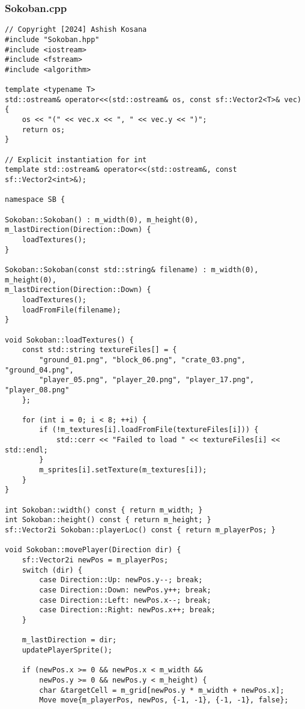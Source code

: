 \documentclass[12pt]{article}
\begin{document}
\subsubsection{Sokoban.cpp}
\begin{lstlisting}[style=cppcode]
// Copyright [2024] Ashish Kosana
#include "Sokoban.hpp"
#include <iostream>
#include <fstream>
#include <algorithm>

template <typename T>
std::ostream& operator<<(std::ostream& os, const sf::Vector2<T>& vec) {
    os << "(" << vec.x << ", " << vec.y << ")";
    return os;
}

// Explicit instantiation for int
template std::ostream& operator<<(std::ostream&, const sf::Vector2<int>&);

namespace SB {

Sokoban::Sokoban() : m_width(0), m_height(0), m_lastDirection(Direction::Down) {
    loadTextures();
}

Sokoban::Sokoban(const std::string& filename) : m_width(0), m_height(0),
m_lastDirection(Direction::Down) {
    loadTextures();
    loadFromFile(filename);
}

void Sokoban::loadTextures() {
    const std::string textureFiles[] = {
        "ground_01.png", "block_06.png", "crate_03.png", "ground_04.png",
        "player_05.png", "player_20.png", "player_17.png", "player_08.png"
    };

    for (int i = 0; i < 8; ++i) {
        if (!m_textures[i].loadFromFile(textureFiles[i])) {
            std::cerr << "Failed to load " << textureFiles[i] << std::endl;
        }
        m_sprites[i].setTexture(m_textures[i]);
    }
}

int Sokoban::width() const { return m_width; }
int Sokoban::height() const { return m_height; }
sf::Vector2i Sokoban::playerLoc() const { return m_playerPos; }

void Sokoban::movePlayer(Direction dir) {
    sf::Vector2i newPos = m_playerPos;
    switch (dir) {
        case Direction::Up: newPos.y--; break;
        case Direction::Down: newPos.y++; break;
        case Direction::Left: newPos.x--; break;
        case Direction::Right: newPos.x++; break;
    }

    m_lastDirection = dir;
    updatePlayerSprite();

    if (newPos.x >= 0 && newPos.x < m_width &&
        newPos.y >= 0 && newPos.y < m_height) {
        char &targetCell = m_grid[newPos.y * m_width + newPos.x];
        Move move{m_playerPos, newPos, {-1, -1}, {-1, -1}, false};


\end{lstlisting}
\end{document}
